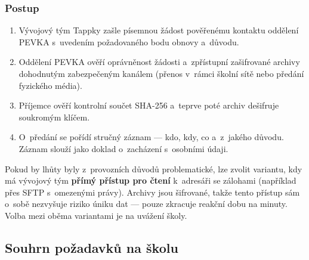 \documentclass[11pt,a4paper]{article}
\begin{document}
\subsubsection*{Postup}

\begin{enumerate}[leftmargin=1.6em]
  \item Vývojový tým Tappky zašle písemnou žádost pověřenému kontaktu oddělení PEVKA s~uvedením
        požadovaného bodu obnovy a~důvodu.
  \item Oddělení PEVKA ověří oprávněnost žádosti a~zpřístupní zašifrované archivy dohodnutým
        zabezpečeným kanálem (přenos v~rámci školní sítě nebo předání fyzického média).
  \item Příjemce ověří kontrolní součet SHA-256 a~teprve poté archiv dešifruje soukromým klíčem.
  \item O~předání se pořídí stručný záznam --- kdo, kdy, co a~z~jakého důvodu. Záznam slouží jako
        doklad o~zacházení s~osobními údaji.
\end{enumerate}

\begin{informace}
Pokud by lhůty byly z~provozních důvodů problematické, lze zvolit variantu, kdy má vývojový tým
\textbf{přímý přístup pro čtení} k~adresáři se zálohami (například přes SFTP s~omezenými právy).
Archivy jsou šifrované, takže tento přístup sám o~sobě nezvyšuje riziko úniku dat --- pouze
zkracuje reakční dobu na minuty. Volba mezi oběma variantami je na uvážení školy.
\end{informace}

\subsection{Souhrn požadavků na školu}
\end{document}
